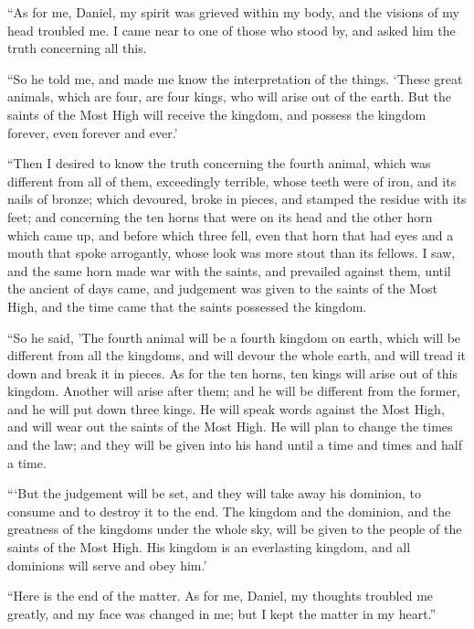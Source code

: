  ``As for me, Daniel, my spirit was grieved within my body,
and the visions of my head troubled me.  I came near to one
of those who stood by, and asked him the truth concerning all this.

``So he told me, and made me know the interpretation of the things.
 `These great animals, which are four, are four kings, who
will arise out of the earth.  But the saints of the Most
High will receive the kingdom, and possess the kingdom forever, even
forever and ever.'

 ``Then I desired to know the truth concerning the fourth
animal, which was different from all of them, exceedingly terrible,
whose teeth were of iron, and its nails of bronze; which devoured, broke
in pieces, and stamped the residue with its feet;  and
concerning the ten horns that were on its head and the other horn which
came up, and before which three fell, even that horn that had eyes and a
mouth that spoke arrogantly, whose look was more stout than its fellows.
 I saw, and the same horn made war with the saints, and
prevailed against them,  until the ancient of days came,
and judgement was given to the saints of the Most High, and the time
came that the saints possessed the kingdom.

 ``So he said, 'The fourth animal will be a fourth kingdom
on earth, which will be different from all the kingdoms, and will devour
the whole earth, and will tread it down and break it in pieces.
 As for the ten horns, ten kings will arise out of this
kingdom. Another will arise after them; and he will be different from
the former, and he will put down three kings.  He will
speak words against the Most High, and will wear out the saints of the
Most High. He will plan to change the times and the law; and they will
be given into his hand until a time and times and half a time.

 ```But the judgement will be set, and they will take away
his dominion, to consume and to destroy it to the end.  The
kingdom and the dominion, and the greatness of the kingdoms under the
whole sky, will be given to the people of the saints of the Most High.
His kingdom is an everlasting kingdom, and all dominions will serve and
obey him.'

 ``Here is the end of the matter. As for me, Daniel, my
thoughts troubled me greatly, and my face was changed in me; but I kept
the matter in my heart.''

